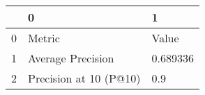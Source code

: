 \begin{tabular}{lll}
\toprule
{} &                       0 &         1 \\
\midrule
0 &                  Metric &     Value \\
1 &       Average Precision &  0.689336 \\
2 &  Precision at 10 (P@10) &       0.9 \\
\bottomrule
\end{tabular}
